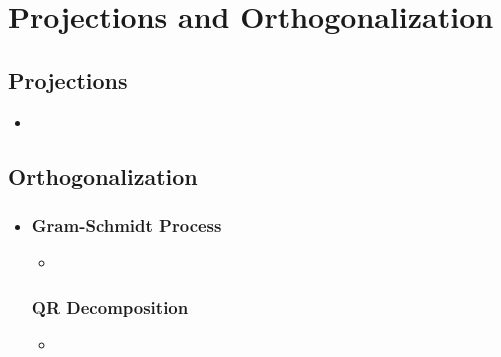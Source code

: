 \chapter{Projections and Orthogonalization}\label{Projections and Orthogonalization}

\section{Projections}\label{Projections}
\begin{itemize}
  \item
  
  
\end{itemize}


\section{Orthogonalization}\label{Orthogonalization}
\begin{itemize}
  \item

  \subsection{Gram-Schmidt Process}\label{Gram-Schmidt Process}
  \begin{itemize}
    \item 
  \end{itemize}

  \subsection{QR Decomposition}\label{QR Decomposition}
  \begin{itemize}
    \item 
  \end{itemize}
  
  
\end{itemize}
